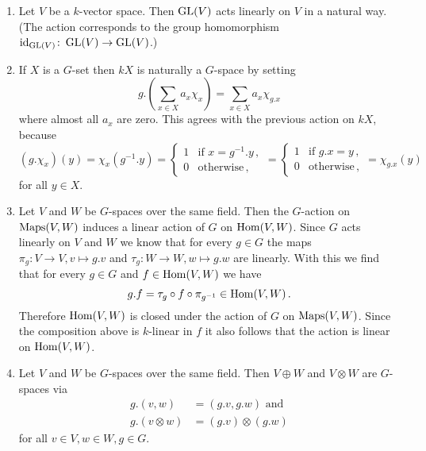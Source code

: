 \begin{example}
  \begin{enumerate}[label=\emph{\alph*)},leftmargin=*]
    \item
      Let $V$ be a $k$-vector space.
      Then $\operatorname{GL}(V)$ acts linearly on $V$ in a natural way.
      (The action corresponds to the group homomorphism $\operatorname{id}_{\operatorname{GL}(V)} \colon \operatorname{GL}(V) \to \operatorname{GL}(V)$.)
    \item
      If $X$ is a $G$-set then $kX$ is naturally a $G$-space by setting
      \[
          g.\left(\sum_{x \in X} a_x \chi_x\right)
        = \sum_{x \in X} a_x \chi_{g.x}
      \]
      where almost all $a_x$ are zero.
      This agrees with the previous action on $kX$, because
      \[
          (g.\chi_x)(y)
        = \chi_x(g^{-1}.y)
        = \begin{cases}
            1 & \text{if } x = g^{-1}.y \,, \\
            0 & \text{otherwise} \,,
          \end{cases}
        = \begin{cases}
            1 & \text{if } g.x = y \,,  \\
            0 & \text{otherwise} \,,
          \end{cases}
        = \chi_{g.x}(y)
      \]
      for all $y \in X$.
    \item
      Let $V$ and $W$ be $G$-spaces over the same field.
      Then the $G$-action on $\operatorname{Maps}(V,W)$ induces a linear action of $G$ on $\operatorname{Hom}(V,W)$.
      Since $G$ acts linearly on $V$ and $W$ we know that for every $g \in G$ the maps $\pi_g \colon V \to V, v \mapsto g.v$ and $\tau_g \colon W \to W, w \mapsto g.w$ are linearly.
      With this we find that for every $g \in G$ and $f \in \operatorname{Hom}(V,W)$ we have
      \[
            g.f
        =   \tau_g \circ f \circ \pi_{g^{-1}}
        \in \operatorname{Hom}(V,W) \,.
      \]
      Therefore $\operatorname{Hom}(V,W)$ is closed under the action of $G$ on $\operatorname{Maps}(V,W)$.
      Since the composition above is $k$-linear in $f$ it also follows that the action is linear on $\operatorname{Hom}(V,W)$.
    \item
      Let $V$ and $W$ be $G$-spaces over the same field.
      Then $V \oplus W$ and $V \otimes W$ are $G$-spaces via
      \begin{align*}
            g.(v,w)
        &= (g.v,g.w)
           \text{ and }
            \tag{1}
        \\
            g.(v \otimes w)
        &=  (g.v) \otimes (g.w)
            \tag{2}
      \end{align*}
      for all $v \in V, w \in W, g \in G$. 

\end{enumerate}
\end{example}
